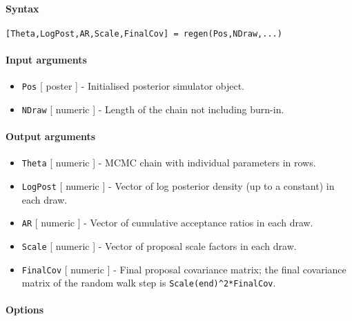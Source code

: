 


	\paragraph{Syntax}\label{syntax}

\begin{verbatim}
[Theta,LogPost,AR,Scale,FinalCov] = regen(Pos,NDraw,...)
\end{verbatim}

\paragraph{Input arguments}\label{input-arguments}

\begin{itemize}
\item
  \texttt{Pos} {[} poster {]} - Initialised posterior simulator object.
\item
  \texttt{NDraw} {[} numeric {]} - Length of the chain not including
  burn-in.
\end{itemize}

\paragraph{Output arguments}\label{output-arguments}

\begin{itemize}
\item
  \texttt{Theta} {[} numeric {]} - MCMC chain with individual parameters
  in rows.
\item
  \texttt{LogPost} {[} numeric {]} - Vector of log posterior density (up
  to a constant) in each draw.
\item
  \texttt{AR} {[} numeric {]} - Vector of cumulative acceptance ratios
  in each draw.
\item
  \texttt{Scale} {[} numeric {]} - Vector of proposal scale factors in
  each draw.
\item
  \texttt{FinalCov} {[} numeric {]} - Final proposal covariance matrix;
  the final covariance matrix of the random walk step is
  \texttt{Scale(end)\^{}2*FinalCov}.
\end{itemize}

\paragraph{Options}\label{options}

